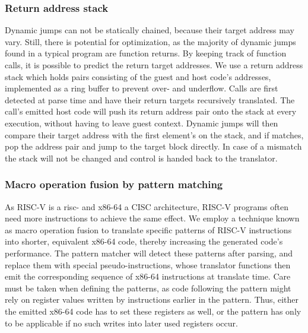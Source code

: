 \subsubsection{Return address stack}
\label{sec:return_address_stack}
Dynamic jumps can not be statically chained, because their target address may vary.
Still, there is potential for optimization, as the majority of dynamic jumps found in a typical program are function returns.
By keeping track of function calls, it is possible to predict the return target addresses.
We use a return address stack which holds pairs consisting of the guest and host code's addresses, implemented as a ring buffer to prevent over- and underflow.
Calls are first detected at parse time and have their return targets recursively translated.
The call's emitted host code will push its return address pair onto the stack at every execution, without having to leave guest context.
Dynamic jumps will then compare their target address with the first element's on the stack, and if matches, pop the address pair and jump to the target block directly.
In case of a mismatch the stack will not be changed and control is handed back to the translator.


\subsubsection{Macro operation fusion by pattern matching}
As RISC-V is a risc- and x86-64 a CISC architecture, RISC-V programs often need more instructions to achieve the same effect.
We employ a technique known as macro operation fusion to translate specific patterns of RISC-V instructions into shorter, equivalent x86-64 code, thereby increasing the generated code's performance.
The pattern matcher will detect these patterns after parsing, and replace them with special pseudo-instructions, whose translator functions then emit the corresponding sequence of x86-64 instructions at translate time.
Care must be taken when defining the patterns, as code following the pattern might rely on register values written by instructions earlier in the pattern.
Thus, either the emitted x86-64 code has to set these registers as well, or the pattern has only to be applicable if no such writes into later used registers occur.



















